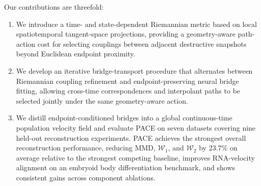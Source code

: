 Our contributions are threefold:
\begin{enumerate}
    \item We introduce a time- and state-dependent Riemannian metric based on local spatiotemporal tangent-space projections, providing a geometry-aware path-action cost for selecting couplings between adjacent destructive snapshots beyond Euclidean endpoint proximity.
    \item We develop an iterative bridge-transport procedure that alternates between Riemannian coupling refinement and endpoint-preserving neural bridge fitting, allowing cross-time correspondences and interpolant paths to be selected jointly under the same geometry-aware action.
\item 
We distill endpoint-conditioned bridges into a global continuous-time population velocity field and evaluate PACE on seven datasets covering nine held-out reconstruction experiments. 
PACE achieves the strongest overall reconstruction performance, reducing MMD, $\mathcal{W}_1$, and $\mathcal{W}_2$ by 23.7\% on average relative to the strongest competing baseline, improves RNA-velocity alignment on an embryoid body differentiation benchmark, and shows consistent gains across component ablations.
\end{enumerate}
